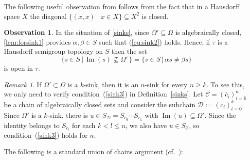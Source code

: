 \documentclass{article}
\theoremstyle{remark}
\newtheorem{remark}[theorem]{Remark}
\theoremstyle{definition}
\newtheorem{observation}[theorem]{Observation}
\newcommand{\nn}[0]{S}%
\DeclareMathOperator{\im}{Im}
\newcommand{\C}[0]{\mathcal{C}}
\newcommand{\D}[0]{\mathcal{D}}
\renewcommand\leq{\leqslant}
\renewcommand\geq{\geqslant}
\begin{document}
{{{{{  The following useful observation from \cite{pinskerschindler} follows from the fact that in a Hausdorff space $X$ the diagonal
$\{(x, x) \mid x \in X\} \subseteq X^2$ is closed.
  \begin{observation}\label{use sink}
  	In the situation of \cref{sinks}, since $\Omega'\subseteq\Omega$ is algebraically closed,  \cref{lem:forsink1} provides $\alpha, \beta\in S$ such that (\ref{eq:sink2}) holds. Hence, if $\tau$ is a Hausdorff semigroup topology on $S$
    then the set
    \begin{equation*}
       \{s\in S\,|\,\im(s)\nsubseteq \Omega'\,\}=\{s\in S\,|\,\alpha s\neq \beta s\}
    \end{equation*}  
  	is open in $\tau$. 
  \end{observation}

\begin{remark} If $\Omega'\subset\Omega$ is a $k$-sink, then it is an $n$-sink for every $n\geq k$. To see this, we only need to verify condition~(\ref{sink3}) in Definition~\ref{sinks}. %
Let $\C=(\overline{c}_i)_{i=0}^n$ be a chain of algebraically closed sets and consider the subchain $\D:=(\overline{c}_i)_{i=0}^k$. Since $\Omega'$ is a $k$-sink, there is $u\in\nn_\D=\nn_{\overline{c}_0}\cdots \nn_{\overline{c}_k}$ with $\im(u)\subseteq\Omega'$. %
 {Since the identity belongs to
  $\nn_{\overline{c}_l}$ for each $k < l \leq n$, we also have $u \in \nn_{\C}$,
  so condition~(\ref{sink3}) holds for $n$.}
\end{remark}

The following is a standard union of chains argument (cf.~\cite[Lemma 4.5]{marimon2025guide}):

}}}}}
\end{document}
